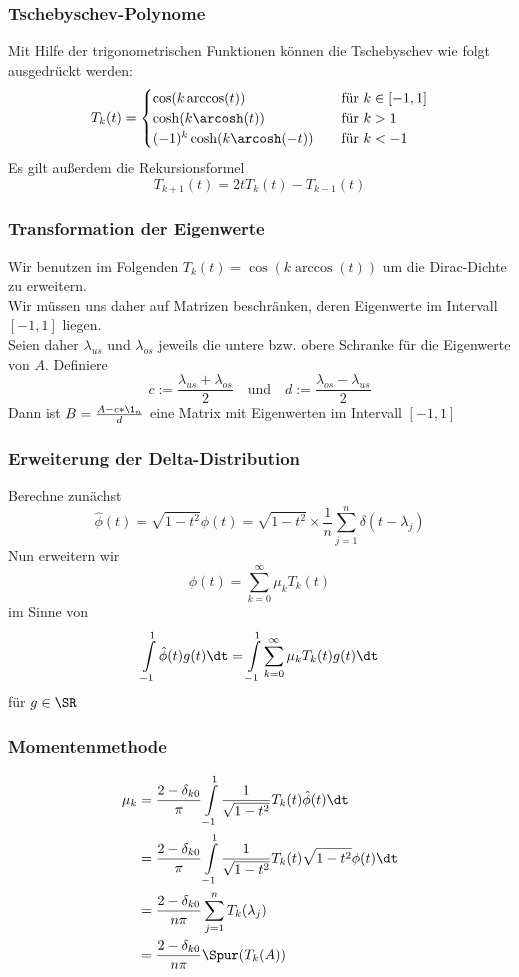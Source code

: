 \begin{frame}
    \frametitle{Tschebyschev-Polynome}
    Mit Hilfe der trigonometrischen Funktionen können die Tschebyschev wie folgt ausgedrückt werden:
    \[ T_k(t) =
    \begin{cases}
        \cos(k \arccos(t))            & \quad \text{für } k \in [-1, 1]\\
        \cosh(k \arcosh(t))           & \quad \text{für } k > 1\\
        (-1)^k \cosh(k \arcosh(-t))   & \quad \text{für } k < -1
    \end{cases}
    \]
    Es gilt außerdem die Rekursionsformel
    $$T_{k + 1}(t) = 2tT_k(t) - T_{k - 1}(t)$$
\end{frame}

\begin{frame}
    \frametitle{Transformation der Eigenwerte}
    Wir benutzen im Folgenden $T_k(t) = \cos(k \arccos(t))$ um die Dirac-Dichte zu erweitern.\\
    Wir müssen uns daher auf Matrizen beschränken, deren Eigenwerte im Intervall $[-1, 1]$ liegen.\\
    Seien daher $\lambda_{us}$ und $\lambda_{os}$ jeweils die untere bzw. obere Schranke für die Eigenwerte von $A$.
    Definiere
    $$c := \frac{\lambda_{us} + \lambda_{os}}{2} \quad \text{und} \quad d := \frac{\lambda_{os} - \lambda_{us}}{2}$$
    Dann ist $B = \frac{A - c*\1_n}{d}$ eine Matrix mit Eigenwerten im Intervall $[-1, 1]$
\end{frame}

\begin{frame}
    \frametitle{Erweiterung der Delta-Distribution}
    Berechne zunächst
    $$\hat{\phi}(t) = \sqrt{1 - t^2} \phi(t) = \sqrt{1 - t^2} \times \frac{1}{n} \sum_{j = 1}^n \delta(t - \lambda_j)$$
    Nun erweitern wir
    $$\hat{\phi}(t) = \sum_{k = 0}^{\infty} \mu_k T_k(t)$$
    im Sinne von
    $$\int \limits_{-1}^1 \hat{\phi}(t) g(t) \dt = \int \limits_{-1}^1 \sum_{k = 0}^{\infty} \mu_k T_k(t) g(t) \dt$$
    für $g \in \SR$
\end{frame}

\begin{frame}
    \frametitle{Momentenmethode}
    \begin{align*}
        \mu_k &= \frac{2 - \delta_{k0}}{\pi} \int\limits_{-1}^1 \frac{1}{\sqrt{1 - t^2}} T_k(t) \hat\phi(t) \dt\\
        &= \frac{2 - \delta_{k0}}{\pi} \int\limits_{-1}^1 \frac{1}{\sqrt{1 - t^2}} T_k(t) \sqrt{1 - t^2} \phi(t) \dt\\
        &= \frac{2 - \delta_{k0}}{n \pi} \sum_{j = 1}^n T_k(\lambda_j)\\
        &= \frac{2 - \delta_{k0}}{n \pi} \Spur(T_k(A))
    \end{align*}
\end{frame}

